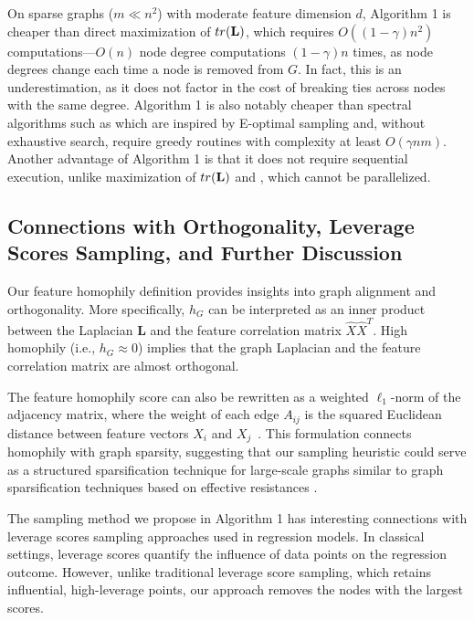 \documentclass[conference]{IEEEtran}
\theoremstyle{definition}
\begin{document}
On sparse graphs ($m \ll n^2$) with moderate feature dimension $d$, Algorithm 1 is cheaper than direct maximization of $tr({\mathbf L})$, which requires $O((1-\gamma)n^2)$ computations---$O(n)$ node degree computations $(1-\gamma)n$ times, as node degrees change each time a node is removed from $G$. In fact, this is an underestimation, as it does not factor in the cost of breaking ties across nodes with the same degree. Algorithm 1 is also notably cheaper than spectral algorithms such as \cite{chen2015discrete,anis2016efficient} which are inspired by E-optimal sampling and, without exhaustive search, require greedy routines with complexity at least $O(\gamma nm)$. Another advantage of Algorithm 1 is that it does not require sequential execution, unlike maximization of $tr({\mathbf L})$ and \cite{chen2015discrete,anis2016efficient}, which cannot be parallelized.

\subsection{Connections with Orthogonality,  Leverage Scores Sampling, and Further Discussion}

Our feature homophily definition provides insights into {graph alignment and orthogonality}. More specifically, $h_G$ can be interpreted as an {inner product} between the Laplacian $\mathbf{L}$ and the feature correlation matrix $\hat{X} \hat{X}^T$. High homophily (i.e., $h_G \approx 0$) implies that the graph Laplacian and the feature correlation matrix are almost orthogonal.

The feature homophily score can also be rewritten as a weighted $\ell_1$-norm of the adjacency matrix, where the weight of each edge $A_{ij}$ is the squared Euclidean distance between feature vectors $X_i$ and $X_j$~\cite{kalofolias2016learn}. This formulation connects homophily with {graph sparsity}, suggesting that our sampling heuristic could serve as a {structured sparsification technique} for large-scale graphs similar to graph sparsification techniques based on effective resistances \cite{spielman2011graph}.

The sampling method we propose in Algorithm 1 has interesting connections with {leverage scores sampling} approaches used in regression models. In classical settings, leverage scores quantify the influence of data points on the regression outcome. However, unlike traditional leverage score sampling, which retains influential, high-leverage points, our approach removes the nodes with the largest scores.
\end{document}
